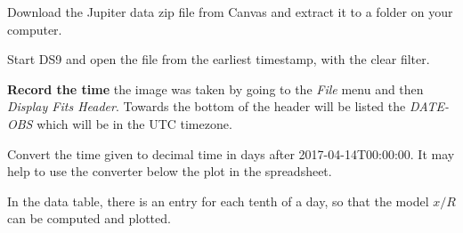 \begin{steps}
	\item Download the Jupiter data zip file from Canvas and extract it to a folder on your computer.
	
	\item Start DS9 and open the file from the earliest timestamp, with the clear filter.
	
	\item \textbf{Record the time} the image was taken by going to the \textit{File} menu and then \textit{Display Fits Header}. Towards the bottom of the header will be listed the \textit{DATE-OBS} which will be in the UTC timezone.
	
	\item Convert the time given to decimal time in days after 2017-04-14T00:00:00. It may help to use the converter below the plot in the spreadsheet.
\end{steps}

In the data table, there is an entry for each tenth of a day, so that the model $x/R$ can be computed and plotted.

